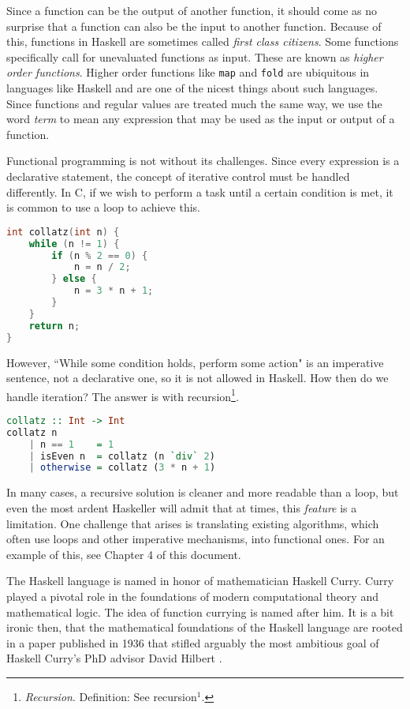 \documentclass[MS, xcolor=dvipsnames]{wfuthesis}
\theoremstyle{definition}
\begin{document}
Since a function can be the output of another function, it should come as no surprise that a function can also be the input to another function. Because of this, functions in Haskell are sometimes called \emph{first class citizens}. Some functions specifically call for unevaluated functions as input. These are known as \emph{higher order functions}. Higher order functions like \lstinline{map} and \lstinline{fold} are ubiquitous in languages like Haskell and are one of the nicest things about such languages. Since functions and regular values are treated much the same way, we use the word \emph{term} to mean any expression that may be used as the input or output of a function. \par
Functional programming is not without its challenges. Since every expression is a declarative statement, the concept of iterative control must be handled differently. In C, if we wish to perform a task until a certain condition is met, it is common to use a loop to achieve this.
\begin{lstlisting}[language=C]
int collatz(int n) {
    while (n != 1) {
        if (n % 2 == 0) {
            n = n / 2;
        } else {
            n = 3 * n + 1;
        }
    }
    return n;
}
\end{lstlisting}
However, ``While some condition holds, perform some action" is an imperative sentence, not a declarative one, so it is not allowed in Haskell. How then do we handle iteration? The answer is with recursion\footnote{\emph{Recursion}. Definition: See recursion$^1$.}.
\begin{lstlisting}[language=Haskell]
collatz :: Int -> Int
collatz n
    | n == 1    = 1
    | isEven n  = collatz (n `div` 2)
    | otherwise = collatz (3 * n + 1)
\end{lstlisting}
In many cases, a recursive solution is cleaner and more readable than a loop, but even the most ardent Haskeller will admit that at times, this \emph{feature} is a limitation. One challenge that arises is translating existing algorithms, which often use loops and other imperative mechanisms, into functional ones. For an example of this, see Chapter 4 of this document. \par
The Haskell language is named in honor of mathematician Haskell Curry. Curry played a pivotal role in the foundations of modern computational theory and mathematical logic. The idea of function currying is named after him. It is a bit ironic then, that the mathematical foundations of the Haskell language are rooted in a paper published in 1936 that stifled arguably the most ambitious goal of Haskell Curry's PhD advisor David Hilbert \cite{Hilbert1928}. \par
\end{document}

